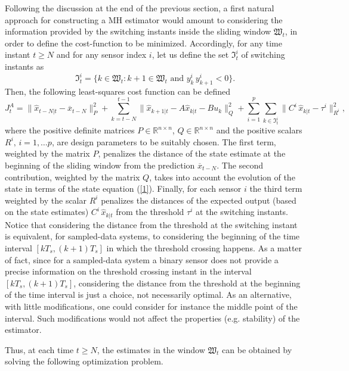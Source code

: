 \documentclass[11pt,journal,onecolumn]{IEEEtran}
\newcommand{\be}{\begin{equation}}
\newcommand{\ee}{\end{equation}}
\begin{document}
Following the discussion at the end of the previous section, a first natural approach for constructing a MH estimator would amount to considering the information provided by the switching instants inside the sliding window $\mathfrak W_t$, in order to define the cost-function to be minimized. Accordingly, for any time instant $t \ge N$ and for any sensor index $i$, let us define the set $\mathfrak{I}_{t}^i$ of switching instants as
\be\label{5}
\mathfrak{I}^{i}_t = \{ k \in \mathfrak{W}_t : k+1  \in \mathfrak{W}_t \mbox{ and } y_k^i \, y_{k+1}^i < 0 \} .
\ee
Then, the following least-squares cost function can be defined
\begin{equation}\label{17}
J^A_{t} = \|\hat{x}_{t-N|t}-\overline{x}_{t-N}\|^{2}_{P}+ \sum_{k=t-N}^{t-1}\|\hat{x}_{k+1|t}-A\hat{x}_{k|t}-Bu_{k}\|^{2}_{Q}
+ \sum_{i=1}^{p}\sum_{k\in\mathfrak{I}^{i}_t} \|C^{i} \, \hat{x}_{k|t}-\tau^{i}\|^{2}_{R^{i}},
\end{equation}
where the positive definite matrices $P\in\mathbb{R}^{n\times n}$, $Q\in\mathbb{R}^{n\times n}$ and the positive scalars $R^i , \, i = 1, \ldots p$, are design parameters to be suitably chosen. The first term, weighted by the matrix $P$, penalizes the distance of the state estimate at the beginning of the sliding window from the prediction $\overline{x}_{t-N}$. The second contribution, weighted by the matrix $Q$, takes into account the evolution of the state in terms of the state equation (\ref{1}). Finally, for each sensor $i$ the third term weighted by the scalar $R^i$ penalizes the distances of the expected output (based on the state estimates) $C^{i} \, \hat{x}_{k|t}$ from the threshold $\tau^i$ at the switching instants.
Notice that considering the distance from the threshold at the switching instant is equivalent, for sampled-data systems, to considering the beginning of the time interval $[k T_s, (k+1) T_s]$ in which the threshold crossing happens. As a matter of fact, since for a sampled-data system a binary sensor does not provide a precise information on the threshold crossing instant in
the interval $[k T_s, (k+1) T_s]$, considering the distance from the threshold at the beginning of the time interval is just a choice, not necessarily optimal. As an alternative, with little modifications, one could consider for instance the middle point of the interval. Such modifications would not affect the properties (e.g. stability) of the estimator.

Thus, at each time $t \ge N$, the estimates in the window $\mathfrak W_t$ can be obtained by solving the following optimization problem. \vspace{.3cm}
\end{document}
